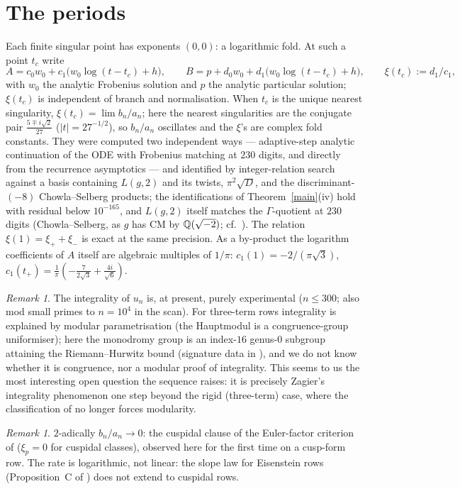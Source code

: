 \documentclass[11pt]{amsart}
\theoremstyle{remark}
\newtheorem{remark}[theorem]{Remark}
\begin{document}
\section{The periods}
Each finite singular point has exponents $(0,0)$: a logarithmic fold. At such a point $t_c$ write
\[A=c_0w_0+c_1\bigl(w_0\log(t-t_c)+h\bigr),\qquad B=p+d_0w_0+d_1\bigl(w_0\log(t-t_c)+h\bigr),\qquad \xi(t_c):=d_1/c_1,\]
with $w_0$ the analytic Frobenius solution and $p$ the analytic particular solution; $\xi(t_c)$ is independent of branch and normalisation. When $t_c$ is the unique nearest singularity, $\xi(t_c)=\lim b_n/a_n$; here the nearest singularities are the conjugate pair $\tfrac{5\mp i\sqrt2}{27}$ ($|t|=27^{-1/2}$), so $b_n/a_n$ oscillates and the $\xi$'s are complex fold constants. They were computed two independent ways --- adaptive-step analytic continuation of the ODE with Frobenius matching at $230$ digits, and directly from the recurrence asymptotics --- and identified by integer-relation search against a basis containing $L(g,2)$ and its twists, $\pi^2\sqrt D$, and the discriminant-$(-8)$ Chowla--Selberg products; the identifications of Theorem~\ref{main}(iv) hold with residual below $10^{-165}$, and $L(g,2)$ itself matches the $\Gamma$-quotient at $230$ digits (Chowla--Selberg, as $g$ has CM by $\mathbb Q(\sqrt{-2})$; cf.\ \cite{ChS}). The relation $\xi(1)=\xi_++\xi_-$ is exact at the same precision. As a by-product the logarithm coefficients of $A$ itself are algebraic multiples of $1/\pi$: $c_1(1)=-2/(\pi\sqrt3)$, $c_1(t_+)=\tfrac1\pi(-\tfrac7{2\sqrt3}+\tfrac{4i}{\sqrt6})$.

\begin{remark}\label{integrality}
The integrality of $u_n$ is, at present, purely experimental ($n\le300$; also mod small primes to $n=10^4$ in the scan). For three-term rows integrality is explained by modular parametrisation (the Hauptmodul is a congruence-group uniformiser); here the monodromy group is an index-$16$ genus-$0$ subgroup attaining the Riemann--Hurwitz bound (signature data in \cite{K3P}), and we do not know whether it is congruence, nor a modular proof of integrality. This seems to us the most interesting open question the sequence raises: it is precisely Zagier's integrality phenomenon \cite{Zag} one step beyond the rigid (three-term) case, where the classification of \cite{CLASS} no longer forces modularity.
\end{remark}

\begin{remark}
$2$-adically $b_n/a_n\to0$: the cuspidal clause of the Euler-factor criterion of \cite{proj} ($\xi_p=0$ for cuspidal classes), observed here for the first time on a cusp-form row. The rate is logarithmic, not linear: the slope law for Eisenstein rows (Proposition~C of \cite{proj}) does not extend to cuspidal rows.
\end{remark}
\end{document}
